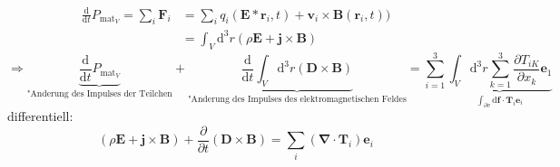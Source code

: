 \documentclass[titlepage,11pt,a4paper,ngerman]{report}
\newcommand{\tx}[1]{\textrm{#1}}
\newcommand{\dd}{\tx{d}}
\renewcommand{\vec}[1]{\boldsymbol{#1}}
\newcommand{\vabla}{\boldsymbol{\nabla}}
\begin{document}

\begin{align*}\frac{\dd}{\dd t}P_{\mathrm{mat}_V}=\sum_i\vec{F}_i&=\sum_iq_i(\vec{E}*\vec{r}_i,t)+\vec{v}_i\times\vec{B}(\vec{r}_i,t))\\
&=\int_V\dd^3r(\rho\vec{E}+\vec{j}\times\vec{B})\end{align*}
\[\Rightarrow\underbrace{\frac{\dd}{\dd t}P_{\mathrm{mat}_V}}_{\textrm{"Anderung des Impulses der Teilchen}}+\underbrace{\frac{\dd}{\dd t}\int_V\dd^3r(\vec{D}\times\vec{B})}_{\textrm{"Anderung des Impulses des elektromagnetischen Feldes}}=\sum_{i=1}^3\underbrace{\int_V\dd^3r\sum_{k=1}^3\frac{\partial T_{iK}}{\partial x_k}\vec{e}_1}_{\int_{\partial v}\dd\vec{f}\cdot\vec{T}_i\vec{e}_i}\]
differentiell:
\[(\rho\vec{E}+\vec{j}\times\vec{B})+\frac{\partial}{\partial t}(\vec{D}\times\vec{B})=\sum_i(\vabla\cdot\vec{T}_i)\vec{e}_i\]
\end{document}
